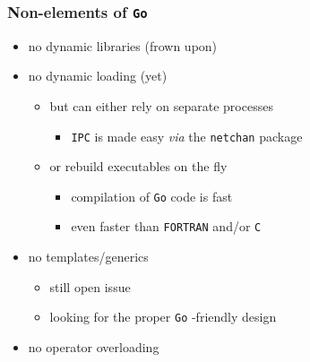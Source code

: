 \documentclass[9pt]{beamer}
\begin{document}
\begin{frame}
\frametitle{Non-elements of \verb~Go~}


\begin{itemize}
\item \alert{no} dynamic libraries (frown upon)
\item \alert{no} dynamic loading (yet)
\begin{itemize}
\item but can either rely on separate processes
\begin{itemize}
\item \verb~IPC~ is made easy \emph{via} the \verb~netchan~ package
\end{itemize}
\item or rebuild executables on the fly
\begin{itemize}
\item \alert{compilation} of \verb~Go~ code is \alert{fast}
\item even faster than \verb~FORTRAN~ and/or \verb~C~
\end{itemize}
\end{itemize}
\item \alert{no} templates/generics
\begin{itemize}
\item still open issue
\item looking for the proper \verb~Go~ -friendly design
\end{itemize}
\item \alert{no} operator overloading
\end{itemize}
\end{frame}

\end{document}
